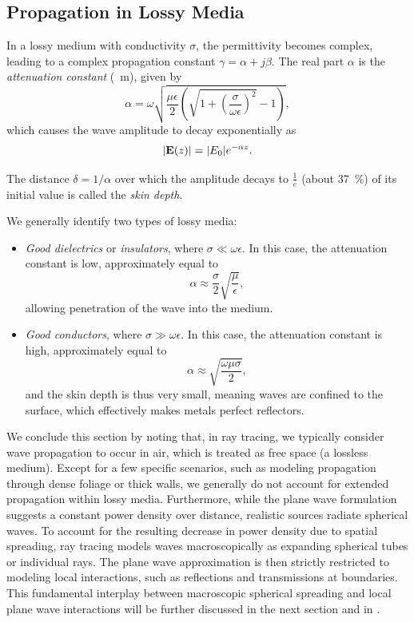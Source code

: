 \subsection{Propagation in Lossy Media}

In a lossy medium with conductivity $\sigma$, the permittivity becomes complex, leading to a complex propagation constant $\gamma = \alpha + j\beta$. The real part $\alpha$ is the \emph{attenuation constant} (\unit{\per\meter}), given by
\begin{equation}
  \alpha = \omega\sqrt{\frac{\mu\epsilon}{2}\left(\sqrt{1+\left(\frac{\sigma}{\omega\epsilon}\right)^2} - 1\right)},
\end{equation}
which causes the wave amplitude to decay exponentially as
\begin{equation}
  |\mathbf{E}(z)| = |E_0| e^{-\alpha z}.
\end{equation}

The distance $\delta = 1/\alpha$ over which the amplitude decays to $\tfrac{1}{e}$ (about \qty{37}{\percent}) of its initial value is called the \emph{skin depth}.

We generally identify two types of lossy media:
\begin{itemize}
  \item \emph{Good dielectrics} or \emph{insulators}, where $\sigma \ll \omega\epsilon$. In this case, the attenuation constant is low, approximately equal to
    \begin{equation}
      \alpha \approx \frac{\sigma}{2}\sqrt{\frac{\mu}{\epsilon}},
    \end{equation}
    allowing penetration of the wave into the medium.
  \item \emph{Good conductors}, where $\sigma \gg \omega\epsilon$. In this case, the attenuation constant is high, approximately equal to
    \begin{equation}
      \alpha \approx \sqrt{\frac{\omega\mu\sigma}{2}},
    \end{equation}
    and the skin depth is thus very small, meaning waves are confined to the surface, which effectively makes metals perfect reflectors.
\end{itemize}

We conclude this section by noting that, in ray tracing, we typically consider wave propagation to occur in air, which is treated as \gls{free space} (a lossless medium). Except for a few specific scenarios, such as modeling propagation through dense foliage or thick walls, we generally do not account for extended propagation within lossy media.
Furthermore, while the plane wave formulation suggests a constant power density over distance, realistic sources radiate spherical waves. To account for the resulting decrease in power density due to spatial spreading, ray tracing models waves macroscopically as expanding spherical tubes or individual rays. The plane wave approximation is then strictly restricted to modeling local interactions, such as reflections and transmissions at boundaries. This fundamental interplay between macroscopic spherical spreading and local plane wave interactions will be further discussed in the next section and in .

